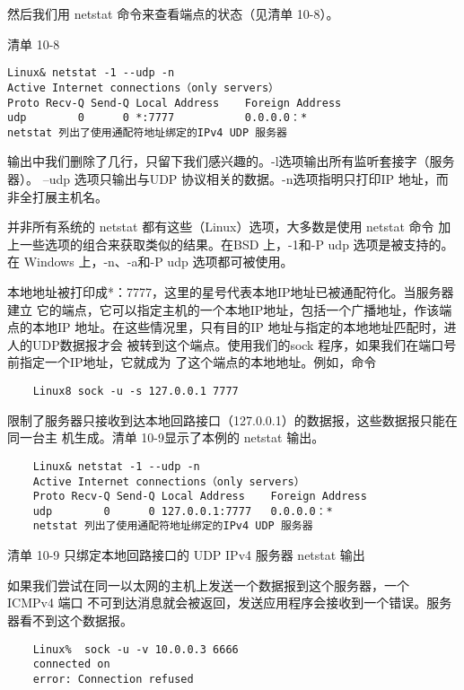 然后我们用 netstat 命令来查看端点的状态（见清单 10-8）。

清单 10-8

\begin{verbatim}
Linux& netstat -1 --udp -n
Active Internet connections（only servers）
Proto Recv-Q Send-Q Local Address    Foreign Address
udp        0      0 *:7777           0.0.0.0：*
netstat 列出了使用通配符地址绑定的IPv4 UDP 服务器
\end{verbatim}

输出中我们删除了几行，只留下我们感兴趣的。-l选项输出所有监听套接字（服务器）。
--udp 选项只输出与UDP 协议相关的数据。-n选项指明只打印IP 地址，而非全打展主机名。

\begin{tcolorbox}
    并非所有系统的 netstat 都有这些（Linux）选项，大多数是使用 netstat 命令
    加上一些选项的组合来获取类似的结果。在BSD 上，-1和-P udp 选项是被支持的。
    在 Windows 上，-n、-a和-P udp 选项都可被使用。
\end{tcolorbox}

本地地址被打印成*：7777，这里的星号代表本地IP地址已被通配符化。当服务器建立
它的端点，它可以指定主机的一个本地IP地址，包括一个广播地址，作该端点的本地IP
地址。在这些情况里，只有目的IP 地址与指定的本地地址匹配时，进人的UDP数据报才会
被转到这个端点。使用我们的sock 程序，如果我们在端口号前指定一个IP地址，它就成为
了这个端点的本地地址。例如，命令

\begin{verbatim}
    Linux8 sock -u -s 127.0.0.1 7777
\end{verbatim}

限制了服务器只接收到达本地回路接口（127.0.0.1）的数据报，这些数据报只能在同一台主
机生成。清单 10-9显示了本例的 netstat 输出。

\begin{verbatim}
    Linux& netstat -1 --udp -n
    Active Internet connections（only servers）
    Proto Recv-Q Send-Q Local Address    Foreign Address
    udp        0      0 127.0.0.1:7777   0.0.0.0：*
    netstat 列出了使用通配符地址绑定的IPv4 UDP 服务器
\end{verbatim}
清单 10-9 只绑定本地回路接口的 UDP IPv4 服务器 netstat 输出

如果我们尝试在同一以太网的主机上发送一个数据报到这个服务器，一个 ICMPv4 端口
不可到达消息就会被返回，发送应用程序会接收到一个错误。服务器看不到这个数据报。

\begin{verbatim}
    Linux%  sock -u -v 10.0.0.3 6666
    connected on
    error: Connection refused
\end{verbatim}

